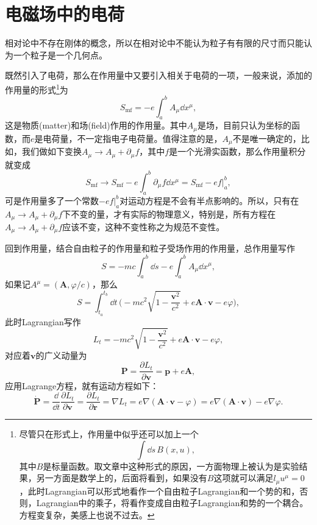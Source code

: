 \documentclass[9pt]{extbook}
\begin{document}


\section{电磁场中的电荷}
相对论中不存在刚体的概念，所以在相对论中不能认为粒子有有限的尺寸而只能认为一个粒子是一个几何点。

既然引入了电荷，那么在作用量中又要引入相关于电荷的一项，一般来说，添加的作用量的形式\footnote{尽管只在形式上，作用量中似乎还可以加上一个\[\int \dd s\, B(x,u),\]其中$B$是标量函数。取文章中这种形式的原因，一方面物理上被认为是实验结果，另一方面是数学上的，后面将看到，如果没有$B$这项就可以满足$l_\mu u^\mu=0$，此时Lagrangian可以形式地看作一个自由粒子Lagrangian和一个势的和，否则，Lagrangian中的乘子，将看作变成自由粒子Lagrangian和势的一个耦合。方程变复杂，美感上也说不过去。}为
\[
	S_{\mathrm{mf}}=-e\int_a^b A_\mu\dd x^\mu,
\]
这是物质(matter)和场(field)作用的作用量。其中$A_\mu$是场，目前只认为坐标的函数，而$e$是电荷量，不一定指电子电荷量。值得注意的是，$A_\mu$不是唯一确定的，比如，我们做如下变换$A_\mu\to A_\mu+\partial_\mu f$，其中$f$是一个光滑实函数，那么作用量积分就变成
\[
	S_{\mathrm{mf}}\to S_{\mathrm{mf}}-e\int_a^b \partial_\mu f \dd x^\mu=S_{\mathrm{mf}}-ef|_a^b,
\]
可是作用量多了一个常数$-ef|_a^b$对运动方程是不会有半点影响的。所以，只有在$A_\mu\to A_\mu+\partial_\mu f$下不变的量，才有实际的物理意义，特别是，所有方程在$A_\mu\to A_\mu+\partial_\mu f$应该不变，这种不变性称之为规范不变性。

回到作用量，结合自由粒子的作用量和粒子受场作用的作用量，总作用量写作
\[
	S=-mc\int_a^b \dd s-e\int_a^b A_\mu\dd x^\mu,
\]
如果记$A^\mu=(\bm{A},\varphi/c)$，那么
\[
	S=\int_{t_a}^{t_b} \dd t\,\biggl(-mc^2\sqrt{1-\frac{\bm{v}^2}{c^2}}+e \bm{A}\cdot\bm{v}-e\varphi\biggr),
\]
此时Lagrangian写作
\[
	L_t=-mc^2\sqrt{1-\frac{\bm{v}^2}{c^2}}+e \bm{A}\cdot\bm{v}-e\varphi,
\]
对应着$\bm{v}$的广义动量为
\[
	\bm{P}=\frac{\partial L_t}{\partial \bm{v}}=\bm{p}+e \bm{A},
\]
应用Lagrange方程，就有运动方程如下：
\[
	\dot{\bm{P}}=\frac{\dd}{\dd t}\frac{\partial L_t}{\partial \bm{v}}=\frac{\partial L_t}{\partial \bm{r}}=\nabla L_t=e\nabla(\bm{A}\cdot\bm{v}-\varphi)=e\nabla(\bm{A}\cdot\bm{v})-e\nabla\varphi.
\]
\end{document}
